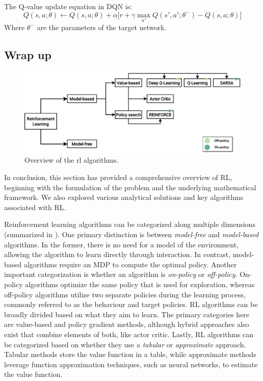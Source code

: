 The Q-value update equation in DQN is:
\begin{equation}
Q(s, a; \theta) \leftarrow Q(s, a; \theta) + \alpha \Big[ r + \gamma \max_{a'} Q(s', a'; \theta^-) - Q(s, a; \theta) \Big]
\end{equation}
Where \(\theta^-\) are the parameters of the target network.
\subsection{Wrap up}
\begin{figure}
  \includegraphics[width=\textwidth]{chapters/img/rl-overview.drawio.pdf}
  \caption{Overview of the \ac{rl} algorithms.}\label{fig:rl:overview}
\end{figure}
In conclusion, 
 this section has provided a comprehensive overview of RL, 
 beginning with the formulation of the problem and the underlying mathematical framework. We also explored various analytical solutions and key algorithms associated with RL. 

Reinforcement learning algorithms can be categorized along multiple dimensions (summarized in ). 
 One primary distinction is between \emph{model-free} and \emph{model-based} algorithms. 
 In the former, there is no need for a model of the environment, allowing the algorithm to learn directly through interaction. 
 In contrast, model-based algorithms require an MDP to compute the optimal policy.
%
Another important categorization is whether an algorithm is \emph{on-policy} or \emph{off-policy}. 
 On-policy algorithms optimize the same policy that is used for exploration, 
 whereas off-policy algorithms utilize two separate policies during the learning process, commonly referred to as the behaviour and target policies.
%
RL algorithms can be broadly divided based on what they aim to learn. 
 The primary categories here are value-based and policy gradient methods, 
 although hybrid approaches also exist that combine elements of both, like actor critic.
%
Lastly, RL algorithms can be categorized based on whether they use a \emph{tabular} or \emph{approximate} approach. 
 Tabular methods store the value function in a table, 
 while approximate methods leverage function approximation techniques, 
 such as neural networks, to estimate the value function.

